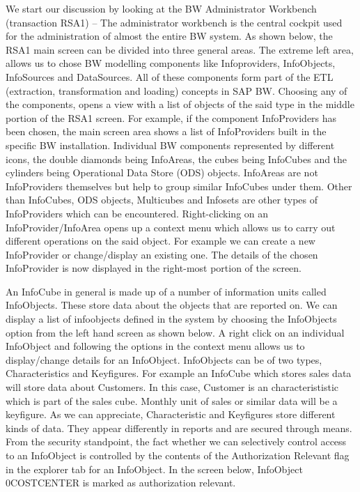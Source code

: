 We start our discussion by looking at the BW Administrator Workbench (transaction RSA1) – The administrator workbench is the central cockpit used for the administration of almost the entire BW system. As shown below, the RSA1 main screen can be divided into three general areas. The extreme left area, allows us to chose BW modelling components like Infoproviders, InfoObjects, InfoSources and DataSources. All of these components form part of the ETL (extraction, transformation and loading) concepts in SAP BW. Choosing any of the components, opens a view with a list of objects of the said type in the middle portion of the RSA1 screen. For example, if the component InfoProviders has been chosen, the main screen area shows a list of InfoProviders built in the specific BW installation. Individual BW components represented by different icons, the double diamonds being InfoAreas, the cubes being InfoCubes and the cylinders being Operational Data Store (ODS) objects. InfoAreas are not InfoProviders themselves but help to group similar InfoCubes under them. Other than InfoCubes, ODS objects, Multicubes and Infosets are other types of InfoProviders which can be encountered.
Right-clicking on an InfoProvider/InfoArea opens up a context menu which allows us to carry out different operations on the said object. For example we can create a new InfoProvider or change/display an existing one. The details of the chosen InfoProvider is now displayed in the right-most portion of the screen.

An InfoCube in general is made up of a number of information units called InfoObjects. These store data about the objects that are reported on. We can display a list of infoobjects defined in the system by choosing the InfoObjects option from the left hand screen as shown below. A right click on an individual InfoObject and following the options in the context menu allows us to display/change details for an InfoObject. InfoObjects can be of two types, Characteristics and Keyfigures. For example an InfoCube which stores sales data will store data about Customers. In this case, Customer is an characterististic which is part of the sales cube. Monthly unit of sales or similar data will be a keyfigure. As we can appreciate, Characteristic and Keyfigures store different kinds of data. They appear differently in reports and are secured through means. From the security standpoint, the fact whether we can selectively control access to an InfoObject is controlled by the contents of the Authorization Relevant flag in the explorer tab for an InfoObject. In the screen below, InfoObject 0COSTCENTER is marked as authorization relevant.

